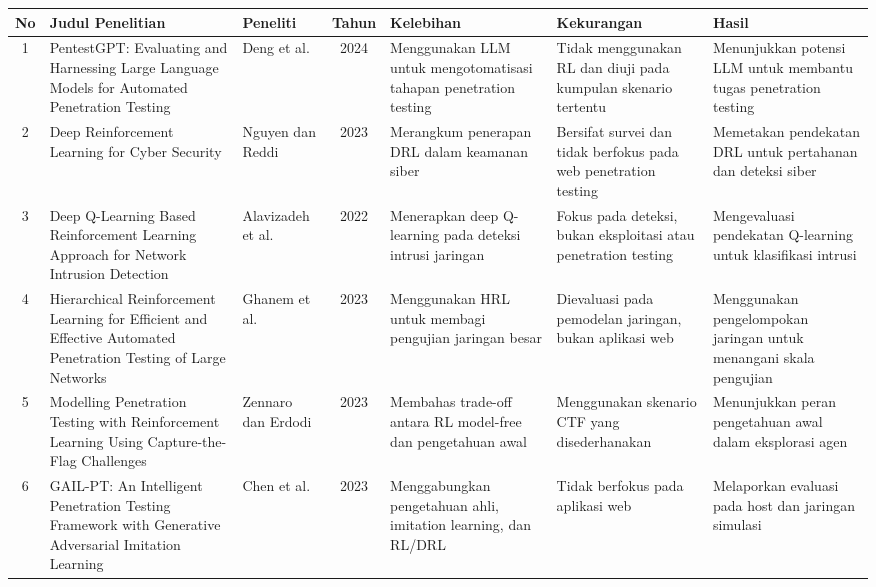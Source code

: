 \begin{table}[H]
\centering
\footnotesize
\renewcommand{\arraystretch}{1.2}
\setlength{\tabcolsep}{3pt}

\begin{tabularx}{\textwidth}{|c|p{3.2cm}|l|c|X|X|X|}
\hline
\textbf{No} & \textbf{Judul Penelitian} & \textbf{Peneliti} & \textbf{Tahun} & \textbf{Kelebihan} & \textbf{Kekurangan} & \textbf{Hasil} \\ \hline

1 & PentestGPT: Evaluating and Harnessing Large Language Models for Automated Penetration Testing & Deng et al. \cite{deng2024pentestgpt} & 2024 & Menggunakan LLM untuk mengotomatisasi tahapan penetration testing & Tidak menggunakan RL dan diuji pada kumpulan skenario tertentu & Menunjukkan potensi LLM untuk membantu tugas penetration testing \\ \hline

2 & Deep Reinforcement Learning for Cyber Security & Nguyen dan Reddi \cite{nguyen2023} & 2023 & Merangkum penerapan DRL dalam keamanan siber & Bersifat survei dan tidak berfokus pada web penetration testing & Memetakan pendekatan DRL untuk pertahanan dan deteksi siber \\ \hline

3 & Deep Q-Learning Based Reinforcement Learning Approach for Network Intrusion Detection & Alavizadeh et al. \cite{alavizadeh2022} & 2022 & Menerapkan deep Q-learning pada deteksi intrusi jaringan & Fokus pada deteksi, bukan eksploitasi atau penetration testing & Mengevaluasi pendekatan Q-learning untuk klasifikasi intrusi \\ \hline

4 & Hierarchical Reinforcement Learning for Efficient and Effective Automated Penetration Testing of Large Networks & Ghanem et al. \cite{ghanem2023hrl} & 2023 & Menggunakan HRL untuk membagi pengujian jaringan besar & Dievaluasi pada pemodelan jaringan, bukan aplikasi web & Menggunakan pengelompokan jaringan untuk menangani skala pengujian \\ \hline

5 & Modelling Penetration Testing with Reinforcement Learning Using Capture-the-Flag Challenges & Zennaro dan Erdodi \cite{zennaro2023} & 2023 & Membahas trade-off antara RL model-free dan pengetahuan awal & Menggunakan skenario CTF yang disederhanakan & Menunjukkan peran pengetahuan awal dalam eksplorasi agen \\ \hline

6 & GAIL-PT: An Intelligent Penetration Testing Framework with Generative Adversarial Imitation Learning & Chen et al. \cite{chen2023gailpt} & 2023 & Menggabungkan pengetahuan ahli, imitation learning, dan RL/DRL & Tidak berfokus pada aplikasi web & Melaporkan evaluasi pada host dan jaringan simulasi \\ \hline


\end{tabularx}
\end{table}
